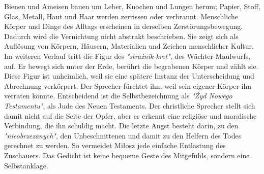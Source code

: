 Bienen und Ameisen bauen um Leber, Knochen und Lungen herum; Papier, Stoff, Glas, Metall, Haut und Haar werden zerrissen oder verbrannt. Menschliche Körper und Dinge des Alltags erscheinen in derselben Zerstörungsbewegung. Dadurch wird die Vernichtung nicht abstrakt beschrieben. Sie zeigt sich als Auflösung von Körpern, Häusern, Materialien und Zeichen menschlicher Kultur.
\\[6pt]
Im weiteren Verlauf tritt die Figur des \textit{"strażnik-kret"}, des Wächter-Maulwurfs, auf. Er bewegt sich unter der Erde, berührt die begrabenen Körper und zählt sie. Diese Figur ist unheimlich, weil sie eine spätere Instanz der Unterscheidung und Abrechnung verkörpert. Der Sprecher fürchtet ihn, weil sein eigener Körper ihn verraten könnte. Entscheidend ist die Selbstbezeichnung als \textit{"Żyd Nowego Testamentu"}, als Jude des Neuen Testaments. Der christliche Sprecher stellt sich damit nicht auf die Seite der Opfer, aber er erkennt eine religiöse und moralische Verbindung, die ihn schuldig macht. Die letzte Angst besteht darin, zu den \textit{"nieobrzezanych"}, den Unbeschnittenen und damit zu den Helfern des Todes gerechnet zu werden. So vermeidet Miłosz jede einfache Entlastung des Zuschauers. Das Gedicht ist keine bequeme Geste des Mitgefühls, sondern eine Selbstanklage.